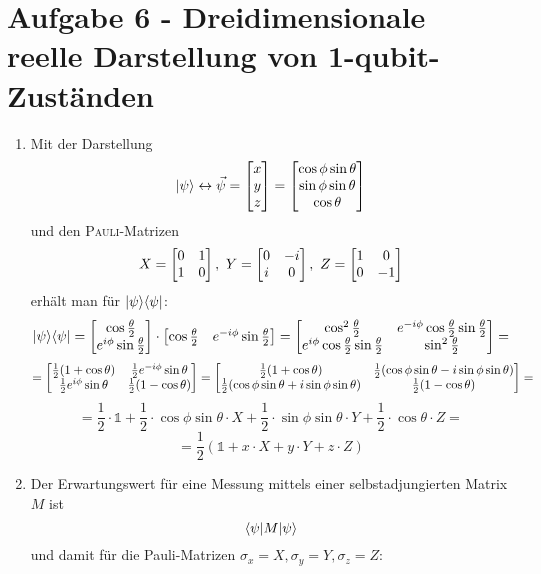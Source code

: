 \section*{Aufgabe 6 - Dreidimensionale reelle Darstellung von 1-qubit-Zuständen}
\begin{enumerate}
\item Mit der Darstellung \[ | \psi \rangle \leftrightarrow \vec\psi =
        \begin{bmatrix}x\\y\\z\end{bmatrix} =
        \begin{bmatrix}\cos\phi \sin\theta \\
                      \sin\phi \sin\theta \\
                      \cos \theta
        \end{bmatrix} \]
      und den \textsc{Pauli}-Matrizen 
        \[ X = \begin{bmatrix}0&1\\1&0\end{bmatrix},\ Y = \begin{bmatrix}0&-i\\i&0\end{bmatrix},\ Z = \begin{bmatrix}1&0\\0&-1\end{bmatrix} \]
      erhält man für $| \psi \rangle\langle \psi |$:
        \[ | \psi \rangle\langle \psi | =
        \begin{bmatrix}\cos\frac{\theta}{2}\\e^{i\phi}\sin\frac{\theta}{2}\end{bmatrix}\cdot
        \begin{bmatrix}{\cos\frac{\theta}{2}} &
        {e^{-i\phi}\sin\frac{\theta}{2}}\end{bmatrix} =
        \begin{bmatrix} \cos^2\frac{\theta }{2} & e^{-i \phi } \cos\frac{\theta }{2}
        \sin\frac{\theta }{2}\\ e^{i \phi } \cos\frac{\theta }{2} \sin\frac{\theta }{2}
        & \sin^2\frac{\theta }{2}\end{bmatrix} = \]
        \[ = \begin{bmatrix}\frac{1}{2}(1+\cos\theta) & \frac{1}{2} e^{-i \phi }
        \sin\theta\\ \frac{1}{2}e^{i\phi}\sin\theta & \frac{1}{2}(1-\cos\theta) \end{bmatrix} = 
        \begin{bmatrix}\frac{1}{2}(1+\cos\theta) & \frac{1}{2}(\cos\phi
        \sin\theta - i\sin\phi\sin\theta)\\ \frac{1}{2}(\cos\phi\sin\theta +
        i\sin\phi\sin\theta) & \frac{1}{2}(1-\cos\theta) \end{bmatrix} = \]
        \[ = \frac{1}{2}\cdot \mathds{1} + \frac{1}{2}\cdot \cos\phi\sin\theta\cdot X + \frac{1}{2}\cdot \sin\phi\sin\theta\cdot Y + \frac{1}{2}\cdot \cos\theta\cdot Z = \]
        \[ = \frac{1}{2}\left(\mathds{1} + x\cdot X + y\cdot Y + z\cdot Z\right) \]
\newcommand{\twopsi}{\vtwo{\cos\frac{\theta}{2}}{e^{i\phi}\sin\frac{\theta}{2}}}
\item Der Erwartungswert für eine Messung mittels einer selbstadjungierten Matrix $M$ ist
        \[ \langle \psi |M| \psi \rangle \]
      und damit für die Pauli-Matrizen $\sigma_x = X, \sigma_y = Y, \sigma_z = Z$:

\end{enumerate}
